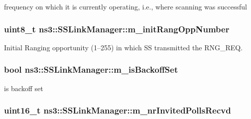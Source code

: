 frequency on which it is currently operating, i.\+e., where scanning was successful 

\subsubsection[{\texorpdfstring{m\+\_\+init\+Rang\+Opp\+Number}{m_initRangOppNumber}}]{\setlength{\rightskip}{0pt plus 5cm}uint8\+\_\+t ns3\+::\+S\+S\+Link\+Manager\+::m\+\_\+init\+Rang\+Opp\+Number\hspace{0.3cm}{\ttfamily [private]}}\hypertarget{classns3_1_1SSLinkManager_a268da8bf334b79ef5d61926c7735cc3e}{}\label{classns3_1_1SSLinkManager_a268da8bf334b79ef5d61926c7735cc3e}


Initial Ranging opportunity (1–255) in which SS transmitted the R\+N\+G\+\_\+\+R\+EQ. 

\subsubsection[{\texorpdfstring{m\+\_\+is\+Backoff\+Set}{m_isBackoffSet}}]{\setlength{\rightskip}{0pt plus 5cm}bool ns3\+::\+S\+S\+Link\+Manager\+::m\+\_\+is\+Backoff\+Set\hspace{0.3cm}{\ttfamily [private]}}\hypertarget{classns3_1_1SSLinkManager_aacf699c5c88344a4ed0f27f5f4558ea3}{}\label{classns3_1_1SSLinkManager_aacf699c5c88344a4ed0f27f5f4558ea3}


is backoff set 

\subsubsection[{\texorpdfstring{m\+\_\+nr\+Invited\+Polls\+Recvd}{m_nrInvitedPollsRecvd}}]{\setlength{\rightskip}{0pt plus 5cm}uint16\+\_\+t ns3\+::\+S\+S\+Link\+Manager\+::m\+\_\+nr\+Invited\+Polls\+Recvd\hspace{0.3cm}{\ttfamily [private]}}\hypertarget{classns3_1_1SSLinkManager_a2f3459e882c316ec2f2423199d7a6349}{}\label{classns3_1_1SSLinkManager_a2f3459e882c316ec2f2423199d7a6349}


